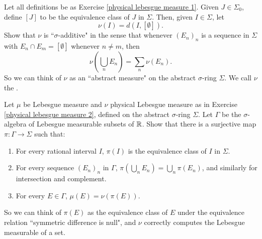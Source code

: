 \begin{exercise}
\label{physical lebesgue measure 2}
Let all definitions be as Exercise \ref{physical lebesgue measure 1}.
Given $J \in \Sigma_0$, define $[J]$ to be the equivalence class of $J$ in $\Sigma$.
Then, given $I \in \Sigma$, let
\[\nu(I) = d(I, [\emptyset]).\]
Show that $\nu$ is ``$\sigma$-additive" in the sense that whenever $(E_n)_n$ is a sequence in $\Sigma$ with $E_n \cap E_m = [\emptyset]$ whenever $n \neq m$, then
\[\nu\left(\bigcup_n E_n\right) = \sum_n \nu(E_n).\]
So we can think of $\nu$ as an ``abstract measure" on the abstract $\sigma$-ring $\Sigma$.
We call $\nu$ the .
\end{exercise}

\begin{exercise}
\label{physical lebesgue measure 3}
Let $\mu$ be Lebesgue measure and $\nu$ physical Lebesgue measure as in Exercise \ref{physical lebesgue measure 2}, defined on the abstract $\sigma$-ring $\Sigma$.
Let $\Gamma$ be the $\sigma$-algebra of Lebesgue measurable subsets of $\mathbb{R}$. Show that there is a surjective map $\pi: \Gamma \to \Sigma$ such that:
\begin{enumerate}
\item For every rational interval $I$, $\pi(I)$ is the equivalence class of $I$ in $\Sigma$.
\item For every sequence $(E_n)_n$ in $\Gamma$, $\pi(\bigcup_n E_n) = \bigcup_n \pi(E_n)$, and similarly for intersection and complement.
\item For every $E \in \Gamma$, $\mu(E) = \nu(\pi(E))$.
\end{enumerate}
So we can think of $\pi(E)$ as the equivalence class of $E$ under the equivalence relation ``symmetric difference is null", and $\nu$ correctly computes the Lebesgue measurable of a set.
\end{exercise}
